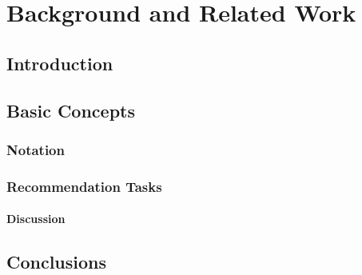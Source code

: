 
\chapter{Background and Related Work} \label{ch:background} 


\section{Introduction}

\blindtext




\section{Basic Concepts}\label{section:concepts}

\blindtext

\subsection{Notation}

\blindtext

\subsection{Recommendation Tasks}\label{section:scenarios}

\blindtext



\subsubsection{Discussion}\label{sec:beyond_rw}

\blindtext


\section{Conclusions}

\blindtext
